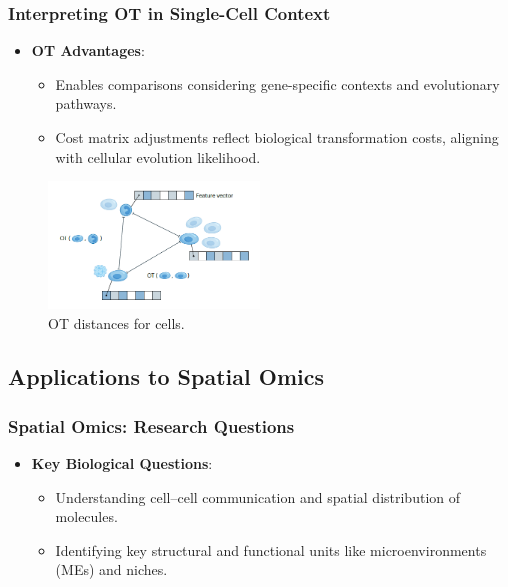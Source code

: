 \documentclass{beamer}
\begin{document}
			\begin{frame}
				\frametitle{Interpreting OT in Single-Cell Context}
				\begin{itemize}
					\item \textbf{OT Advantages}:
						\begin{itemize}
							\item Enables comparisons considering gene-specific contexts and evolutionary pathways.
							\item Cost matrix adjustments reflect biological transformation costs, aligning with cellular evolution likelihood.
						\end{itemize}
					\end{itemize}
					\begin{figure}
						\includegraphics[width=0.5\textwidth]{single_cell.png}
						\caption{OT distances for cells. \cite{bunne2024optimal}}
					\end{figure}
				\end{frame}
	
	\subsection{Applications to Spatial Omics}
	\begin{frame}
		\frametitle{Spatial Omics: Research Questions}
		\begin{itemize}
				
				\item \textbf{Key Biological Questions}:
				\begin{itemize}
					\item Understanding cell–cell communication and spatial distribution of molecules.
					\item Identifying key structural and functional units like microenvironments (MEs) and niches.
				\end{itemize}
			\end{itemize}
		\end{frame}
		
\end{document}
